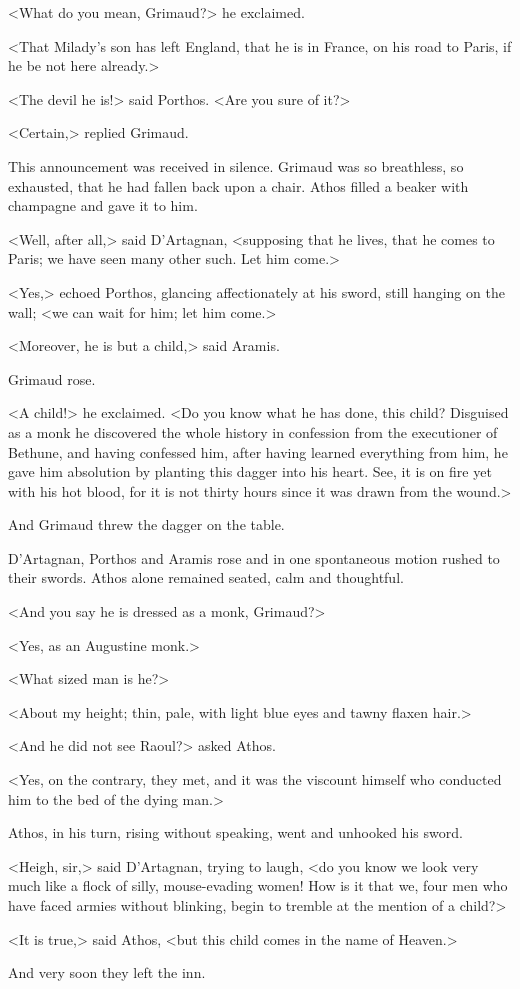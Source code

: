 <What do you mean, Grimaud?> he exclaimed.

<That Milady's son has left England, that he is in France, on his road to Paris, if he be not here already.>

<The devil he is!> said Porthos. <Are you sure of it?>

<Certain,> replied Grimaud.

This announcement was received in silence. Grimaud was so breathless, so exhausted, that he had fallen back upon a chair. Athos filled a beaker with champagne and gave it to him.

<Well, after all,> said D'Artagnan, <supposing that he lives, that he comes to Paris; we have seen many other such. Let him come.>

<Yes,> echoed Porthos, glancing affectionately at his sword, still hanging on the wall; <we can wait for him; let him come.>

<Moreover, he is but a child,> said Aramis.

Grimaud rose.

<A child!> he exclaimed. <Do you know what he has done, this child? Disguised as a monk he discovered the whole history in confession from the executioner of Bethune, and having confessed him, after having learned everything from him, he gave him absolution by planting this dagger into his heart. See, it is on fire yet with his hot blood, for it is not thirty hours since it was drawn from the wound.>

And Grimaud threw the dagger on the table.

D'Artagnan, Porthos and Aramis rose and in one spontaneous motion rushed to their swords. Athos alone remained seated, calm and thoughtful.

<And you say he is dressed as a monk, Grimaud?>

<Yes, as an Augustine monk.>

<What sized man is he?>

<About my height; thin, pale, with light blue eyes and tawny flaxen hair.>

<And he did not see Raoul?> asked Athos.

<Yes, on the contrary, they met, and it was the viscount himself who conducted him to the bed of the dying man.>

Athos, in his turn, rising without speaking, went and unhooked his sword.

<Heigh, sir,> said D'Artagnan, trying to laugh, <do you know we look very much like a flock of silly, mouse-evading women! How is it that we, four men who have faced armies without blinking, begin to tremble at the mention of a child?>

<It is true,> said Athos, <but this child comes in the name of Heaven.>

And very soon they left the inn. 